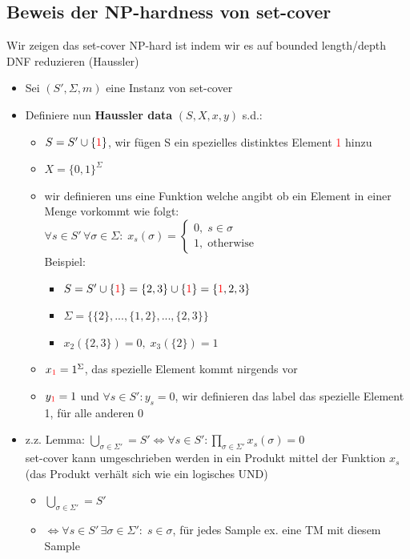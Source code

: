 \documentclass[12pt,a4paper]{article}
\newcommand{\red}[1]{\textcolor{red} {#1}}
\begin{document}
\subsection{Beweis der NP-hardness von set-cover}
Wir zeigen das set-cover NP-hard ist indem wir es auf bounded length/depth DNF reduzieren (Haussler)
\begin{itemize}
\item Sei $(S', \Sigma, m)$ eine Instanz von set-cover
\item Definiere nun \textbf{Haussler data} $(S, X, x, y)$ s.d.:
\begin{itemize}
\item $S = S' \cup \{\red{1}\}$, wir fügen S ein spezielles distinktes Element \red{1} hinzu
\item $X = \{0, 1\}^\Sigma$
\item wir definieren uns eine Funktion welche angibt ob ein Element in einer Menge vorkommt wie folgt:\\
$\displaystyle \forall s \in S' \, \forall \sigma \in \Sigma: \; x_s(\sigma) = \begin{cases}0, \; s\in \sigma \\ 1, \; \text{otherwise}\end{cases}$\\
Beispiel:
\begin{itemize}
\item $S = S' \cup \{\red{1}\} = \{2, 3\} \cup \{\red{1}\} = \{\red{1}, 2, 3\}$
\item $\Sigma = \{\{2\},...,\{1, 2\},...,\{2, 3\}\}$
\item $x_2(\{2, 3\}) = 0, \; x_3(\{2\}) = 1$
\end{itemize}
\item $x_{\red{1}} = 1^\Sigma$, das spezielle Element kommt nirgends vor
\item $y_{\red{1}} = 1$ und $\forall s \in S': y_s = 0$, wir definieren das label das  spezielle Element 1, für alle anderen 0
\end{itemize}
\item z.z. Lemma: $\displaystyle \bigcup_{\sigma \in \Sigma'} = S' \Leftrightarrow \forall s\in S' : \prod_{\sigma\in\Sigma'}x_s(\sigma) = 0$\\
set-cover kann umgeschrieben werden in ein Produkt mittel der Funktion $x_s$ (das Produkt verhält sich wie ein logisches UND)
\begin{itemize}
\item $\displaystyle \bigcup_{\sigma \in \Sigma'} = S'$
\item $\Leftrightarrow \forall s\in S' \, \exists \sigma \in \Sigma': \; s\in\sigma$, für jedes Sample ex. eine TM mit diesem Sample

\end{itemize}
\end{itemize}
\end{document}
